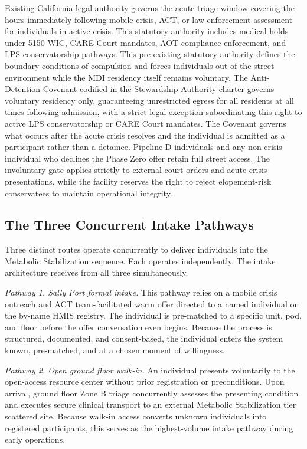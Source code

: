 \documentclass[12pt, letterpaper]{article}
\begin{document}
Existing California legal authority governs the acute triage window covering the hours immediately following mobile crisis, ACT, or law enforcement assessment for individuals in active crisis. This statutory authority includes medical holds under 5150 WIC, CARE Court mandates, AOT compliance enforcement, and LPS conservatorship pathways. This pre-existing statutory authority defines the boundary conditions of compulsion and forces individuals out of the street environment while the MDI residency itself remains voluntary. The Anti-Detention Covenant codified in the Stewardship Authority charter governs voluntary residency only, guaranteeing unrestricted egress for all residents at all times following admission, with a strict legal exception subordinating this right to active LPS conservatorship or CARE Court mandates. The Covenant governs what occurs after the acute crisis resolves and the individual is admitted as a participant rather than a detainee. Pipeline D individuals and any non-crisis individual who declines the Phase Zero offer retain full street access. The involuntary gate applies strictly to external court orders and acute crisis presentations, while the facility reserves the right to reject elopement-risk conservatees to maintain operational integrity.

\subsection{The Three Concurrent Intake Pathways}

Three distinct routes operate concurrently to deliver individuals into the Metabolic Stabilization sequence. Each operates independently. The intake architecture receives from all three simultaneously.

\textit{Pathway 1. Sally Port formal intake.} This pathway relies on a mobile crisis outreach and ACT team-facilitated warm offer directed to a named individual on the by-name HMIS registry. The individual is pre-matched to a specific unit, pod, and floor before the offer conversation even begins. Because the process is structured, documented, and consent-based, the individual enters the system known, pre-matched, and at a chosen moment of willingness.

\textit{Pathway 2. Open ground floor walk-in.} An individual presents voluntarily to the open-access resource center without prior registration or preconditions. Upon arrival, ground floor Zone B triage concurrently assesses the presenting condition and executes secure clinical transport to an external Metabolic Stabilization tier scattered site. Because walk-in access converts unknown individuals into registered participants, this serves as the highest-volume intake pathway during early operations.
\end{document}
